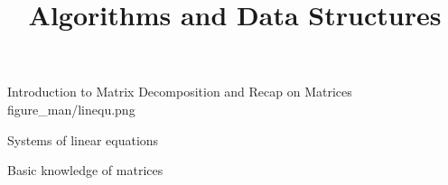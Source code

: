 \documentclass[11pt,compress,t,notes=noshow, xcolor=table]{beamer}
\title{Algorithms and Data Structures}
\begin{document}
{Introduction to Matrix Decomposition and Recap on Matrices}
{figure_man/linequ.png}
{
  \item Systems of linear equations
  \item Basic knowledge of matrices
}

% 
% 
% 
% 
% 
% 
% 
% 
% 

\end{document}

